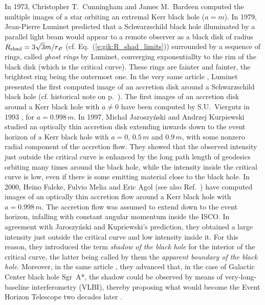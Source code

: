 \begin{hist} \label{h:gik:disk_images}
In 1973, Christopher T.~Cunningham and James M.~Bardeen
\cite{CunniB73}
computed the multiple images of a star orbiting an extremal Kerr black hole ($a=m$).
In 1979, Jean-Pierre Luminet
\cite{Lumin79} predicted that a Schwarzschild black hole illuminated by a parallel light beam
would appear to a remote observer as a black disk of radius $R_{\rm shad} = 3\sqrt{3} m / r_{\mathscr{O}}$
(cf. Eq.~(\ref{e:gik:R_shad_limits})) surrounded by a sequence of rings, called \emph{ghost rings}
by Luminet, converging exponentiallty to the rim of the black disk (which is the
critical curve). These rings are fainter and fainter, the brightest ring being the outermost one.
In the very same article \cite{Lumin79}, Luminet presented the first computed image of an accretion
disk around a Schwarzschild black hole (cf. historical note on p.~\pageref{h:gis:bh_images}).
The first images of an accretion disk around a Kerr black hole with $a\neq 0$ have
been computed by S.U.~Viergutz in 1993 \cite{Vierg93}, for $a=0.998\, m$.
In 1997, Micha\l{} Jaroszy\'nski and
Andrzej Kurpiewski \cite{JarosK97} studied an optically thin
accretion disk extending inwards down to the event horizon of a Kerr black hole
with $a=0$, $0.5\, m$ and $0.9\, m$, with some nonzero radial component of the accretion flow.
They showed that the observed intensity just outside the critical curve is enhanced
by the long path length of geodesics orbiting many times around the black hole,
while the intensity inside the critical curve is low, even if there is
some emitting material close to the black hole.
In 2000, Heino Falcke, Fulvio Melia and Eric Agol
\cite{FalckMA00} (see also Ref.~\cite{Falck17})
have computed images of an optically thin accretion flow around a Kerr black hole with
$a=0.998\, m$. The accretion flow was assumed to extend down to the event horizon, infalling
with constant angular momentum inside the ISCO. In agreement with Jaroszy\'nski and
Kupriewski's prediction, they obtained a large intensity just outside the critical curve
and low intensity inside it. For this reason, they introduced the term
\emph{shadow of the black hole}
for the interior of the critical curve, the latter being called by them
the \emph{apparent boundary of the black hole}. Moreover, in the same article \cite{FalckMA00},
they advanced that, in the case of Galactic Center black hole Sgr~A*, the shadow could be observed
by means of very-long-baseline interferometry (VLBI), thereby proposing what would
become the Event Horizon Telescope two decades later \cite{EHT19a}.
\end{hist}


